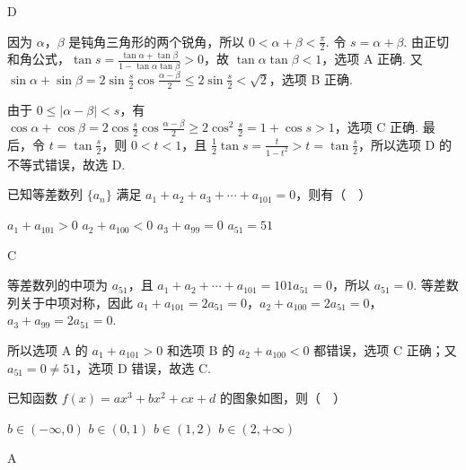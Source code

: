 \begin{answer}
D
\end{answer}

\begin{solution}
因为 \(\alpha\)，\(\beta\) 是钝角三角形的两个锐角，所以 \(0<\alpha+\beta<\frac\pi2\). 令 \(s=\alpha+\beta\). 由正切和角公式，\(\tan s=\frac{\tan\alpha+\tan\beta}{1-\tan\alpha\tan\beta}>0\)，故 \(\tan\alpha\tan\beta<1\)，选项 A 正确. 又
\(\sin\alpha+\sin\beta=2\sin\frac s2\cos\frac{\alpha-\beta}{2}\leq2\sin\frac s2<\sqrt2\)，选项 B 正确.

由于 \(0\leq|\alpha-\beta|<s\)，有
\(\cos\alpha+\cos\beta=2\cos\frac s2\cos\frac{\alpha-\beta}{2}\geq2\cos^2\frac s2=1+\cos s>1\)，选项 C 正确. 最后，令 \(t=\tan\frac s2\)，则 \(0<t<1\)，且 \(\frac12\tan s=\frac{t}{1-t^2}>t=\tan\frac s2\)，所以选项 D 的不等式错误，故选 D.
\end{solution}

\begin{problem}
已知等差数列 \(\{a_n\}\) 满足 \(a_1+a_2+a_3+\cdots+a_{101}=0\)，则有（\(\quad\)）

\choices
    {\(a_{1} + a_{101} > 0\)}
    {\(a_2 + a_{100} < 0\)}
    {\(a_{3} + a_{99} = 0\)}
    {\(a_{51} = 51\)}
\end{problem}

\begin{answer}
C
\end{answer}

\begin{solution}
等差数列的中项为 \(a_{51}\)，且
\(a_1+a_2+\cdots+a_{101}=101a_{51}=0\)，所以 \(a_{51}=0\). 等差数列关于中项对称，因此 \(a_1+a_{101}=2a_{51}=0\)，\(a_2+a_{100}=2a_{51}=0\)，\(a_3+a_{99}=2a_{51}=0\).

所以选项 A 的 \(a_1+a_{101}>0\) 和选项 B 的 \(a_2+a_{100}<0\) 都错误，选项 C 正确；又 \(a_{51}=0\ne51\)，选项 D 错误，故选 C.
\end{solution}

\begin{problem}
已知函数 \(f(x)=ax^3+bx^2+cx+d\) 的图象如图，则（\(\quad\)）


\choices
    {\(b\in(-\infty,0)\)}
    {\(b\in(0,1)\)}
    {\(b\in(1,2)\)}
    {\(b\in(2,+\infty)\)}
\end{problem}

\begin{answer}
A
\end{answer}

